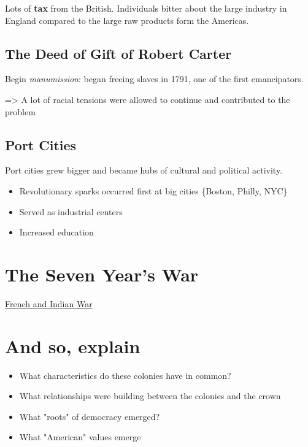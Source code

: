 \documentclass[letterpaper]{article}
\begin{document}
Lots of \textbf{\textbf{tax}} from the British. Individuals bitter about the large industry in England compared to the large raw products form the Americas.

\subsection{The Deed of Gift of Robert Carter}
\label{sec:org6baae4f}
Begin \emph{manumission}: began freeing slaves in 1791, one of the first emancipators.

=> A lot of racial tensions were allowed to continue and contributed to the problem

\subsection{Port Cities}
\label{sec:org924c30b}
Port cities grew bigger and became hubs of cultural and political activity.

\begin{itemize}
\item Revolutionary sparks occurred first at big cities \{Boston, Philly, NYC\}
\item Served as industrial centers
\item Increased education
\end{itemize}


\section{The Seven Year's War}
\label{sec:orgff0428b}
\href{KBhFrenchAndIndian.org}{French and Indian War}

\section{And so, explain}
\label{sec:org5d23d32}
\begin{itemize}
\item What characteristics do these colonies have in common?
\item What relationships were building between the colonies and the crown
\item What "roots" of democracy emerged?
\item What "American" values emerge
\end{itemize}
\end{document}
